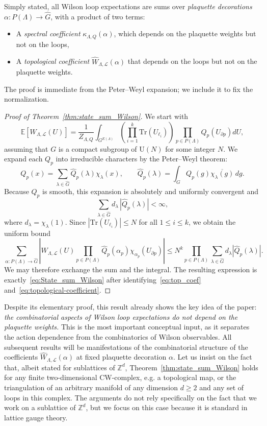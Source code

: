 \documentclass[11pt,a4paper,reqno]{article}
\theoremstyle{definition}
\theoremstyle{remark}
\newcommand\U{{\mathrm U}}
\newcommand\Z{{\mathbb Z}}
\newcommand\Tr{\mathrm{Tr}}
\newcommand\E{\mathbb{E}}
\newcommand\Lc{{\mathcal{L}}}
\begin{document}
Simply stated, all Wilson loop expectations are sums over \emph{plaquette decorations} $\alpha:P(\Lambda)\to\widehat{G}$, with a product of two terms:
\begin{itemize}
\item A \emph{spectral coefficient} $\kappa_{\Lambda,Q}(\alpha)$, which depends on the plaquette weights but not on the loops,
\item A \emph{topological coefficient} $\widehat{W}_{\Lambda,\Lc}(\alpha)$ that depends on the loops but not on the plaquette weights.
\end{itemize}
The proof is immediate from the Peter--Weyl expansion; we include it to fix the normalization.

\begin{proof}[Proof of Theorem~\ref{thm:state_sum_Wilson}]
We start with
\[
\E[W_{\Lambda,\Lc}(U)]=\frac1{Z_{\Lambda,Q}}\int_{G^{E(\Lambda)}}\left(\prod_{i=1}^k\Tr(U_{\ell_i})\right)\prod_{p\in P(\Lambda)}Q_p(U_{\partial p})dU,
\]
assuming that $G$ is a compact subgroup of $\U(N)$ for some integer $N$. We expand each $Q_p$ into irreducible characters by the Peter--Weyl theorem:
\[
Q_p(x)=\sum_{\lambda\in\widehat{G}}\widehat Q_p(\lambda)\chi_\lambda(x),
\qquad
\widehat Q_p(\lambda)=\int_G Q_p(g)\overline{\chi_\lambda(g)}\,dg.
\]
Because $Q_p$ is smooth, this expansion is absolutely and uniformly convergent and
\[
\sum_{\lambda\in \widehat G}d_\lambda\,|\widehat Q_p(\lambda)|<\infty,
\]
where $d_\lambda=\chi_\lambda(1)$. Since $|\Tr(U_{\ell_i})|\leq N$ for all $1\leq i\leq k$, we obtain the uniform bound
\[
\sum_{\alpha:P(\Lambda)\to \widehat G}
\left|
W_{\Lambda,\Lc}(U)
\prod_{p\in P(\Lambda)}
\widehat Q_p(\alpha_p)\chi_{\alpha_p}(U_{\partial p})
\right|
\le
N^k\prod_{p\in P(\Lambda)}\sum_{\lambda\in\widehat G}d_\lambda|\widehat Q_p(\lambda)|.
\]
We may therefore exchange the sum and the integral. The resulting expression is exactly~\eqref{eq:State_sum_Wilson} after identifying~\eqref{eq:top_coef} and~\eqref{eq:topological-coefficient}.
\end{proof}

Despite its elementary proof, this result already shows the key idea of the paper: \emph{the combinatorial aspects of Wilson loop expectations do not depend on the plaquette weights.} This is the most important conceptual input, as it separates the action dependence from the combinatorics of Wilson observables. All subsequent results will be manifestations of the combinatorial structure of the coefficients $\widehat W_{\Lambda,\Lc}(\alpha)$ at fixed plaquette decoration $\alpha$. Let us insist on the fact that, albeit stated for sublattices of $\Z^d$, Theorem~\ref{thm:state_sum_Wilson} holds for any finite two-dimensional CW-complex, e.g. a topological map, or the triangulation of an arbitrary manifold of any dimension $d\geq 2$ and any set of loops in this complex. The arguments do not rely specifically on the fact that we work on a sublattice of $\Z^d$, but we focus on this case because it is standard in lattice gauge theory.
\end{document}
